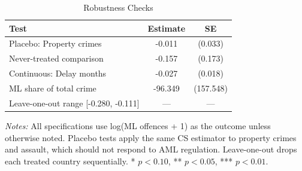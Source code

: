 \begin{table}[htbp]
\centering
\caption{Robustness Checks}
\label{tab:robust}
\begin{threeparttable}
\begin{tabular}{lcc}
\toprule
Test & Estimate & SE \\
\midrule
Placebo: Property crimes & -0.011 & (0.033) \\
Never-treated comparison & -0.157 & (0.173) \\
Continuous: Delay months & -0.027 & (0.018) \\
ML share of total crime & -96.349 & (157.548) \\
Leave-one-out range [-0.280, -0.111] & --- & --- \\
\bottomrule
\end{tabular}
\begin{tablenotes}[flushleft]\small
\item \textit{Notes:} All specifications use log(ML offences + 1) as the outcome unless otherwise noted. Placebo tests apply the same CS estimator to property crimes and assault, which should not respond to AML regulation. Leave-one-out drops each treated country sequentially. * $p<0.10$, ** $p<0.05$, *** $p<0.01$.
\end{tablenotes}
\end{threeparttable}
\end{table}
